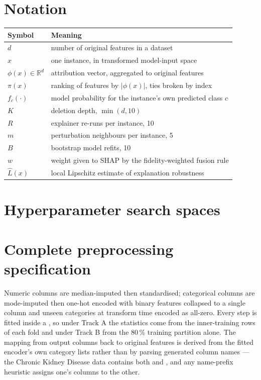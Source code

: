 \section{Notation}
\noindent\begin{tabular}{@{}p{}p{}@{}}
\toprule
Symbol & Meaning \\
\midrule
$d$ & number of original features in a dataset \\
$x$ & one instance, in transformed model-input space \\
$\phi(x) \in \mathbb{R}^{d}$ & attribution vector, aggregated to original features \\
$\pi(x)$ & ranking of features by $|\phi(x)|$, ties broken by index \\
$f_c(\cdot)$ & model probability for the instance's own predicted class $c$ \\
$K$ & deletion depth, $\min(d, 10)$ \\
$R$ & explainer re-runs per instance, 10 \\
$m$ & perturbation neighbours per instance, 5 \\
$B$ & bootstrap model refits, 10 \\
$w$ & weight given to SHAP by the fidelity-weighted fusion rule \\
$\hat{L}(x)$ & local Lipschitz estimate of explanation robustness \\
\bottomrule
\end{tabular}

\section{Hyperparameter search spaces}


\section{Complete preprocessing specification}
Numeric columns are median-imputed then standardised; categorical columns are
mode-imputed then one-hot encoded with binary features collapsed to a single column and
unseen categories at transform time encoded as all-zero. Every step is fitted inside a
, so under Track A the statistics come from the inner-training rows of
each fold and under Track B from the 80\,\% training partition alone. The mapping from
output columns back to original features is derived from the fitted encoder's own
category lists rather than by parsing generated column names --- the Chronic Kidney
Disease data contains both  and , and any name-prefix heuristic
assigns one's columns to the other.

